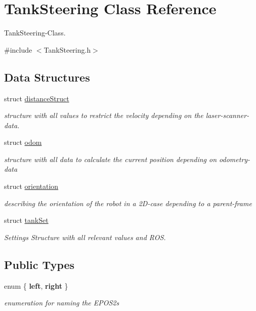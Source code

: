 \hypertarget{classTankSteering}{\section{Tank\-Steering Class Reference}
\label{classTankSteering}
}


Tank\-Steering-\/\-Class.  




{\ttfamily \#include $<$Tank\-Steering.\-h$>$}

\subsection*{Data Structures}
\begin{DoxyCompactItemize}
\item 
struct \hyperlink{structTankSteering_1_1distanceStruct}{distance\-Struct}
\begin{DoxyCompactList}\small\item\em structure with all values to restrict the velocity depending on the laser-\/scanner-\/data. \end{DoxyCompactList}\item 
struct \hyperlink{structTankSteering_1_1odom}{odom}
\begin{DoxyCompactList}\small\item\em structure with all data to calculate the current position depending on odometry-\/data \end{DoxyCompactList}\item 
struct \hyperlink{structTankSteering_1_1orientation}{orientation}
\begin{DoxyCompactList}\small\item\em describing the orientation of the robot in a 2\-D-\/case depending to a parent-\/frame \end{DoxyCompactList}\item 
struct \hyperlink{structTankSteering_1_1tankSet}{tank\-Set}
\begin{DoxyCompactList}\small\item\em Settings Structure with all relevant values and R\-O\-S. \end{DoxyCompactList}\end{DoxyCompactItemize}
\subsection*{Public Types}
\begin{DoxyCompactItemize}
\item 
enum \{ {\bfseries left}, 
{\bfseries right}
 \}
\begin{DoxyCompactList}\small\item\em enumeration for naming the E\-P\-O\-S2s \end{DoxyCompactList}\end{DoxyCompactItemize}
